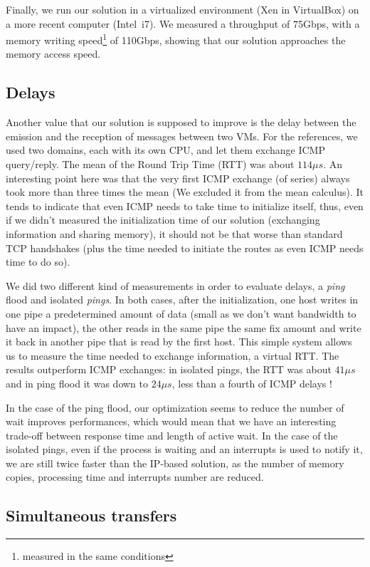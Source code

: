 \documentclass[journal]{IEEEtran}
\begin{document}
Finally, we run our solution in a virtualized environment (Xen in VirtualBox) on a more recent computer (Intel\textregistered ~i7). We measured a throughput of 75Gbps, with a memory writing speed\footnote{measured in the same conditions} of 110Gbps, showing that our solution approaches the memory access speed. 

\subsection{Delays}

Another value that our solution is supposed to improve is the delay between the emission and the reception of messages between two VMs. For the references, we used two domains, each with its own CPU, and let them exchange ICMP query/reply. The mean of the Round Trip Time (RTT) was about $114 \mu s$. An interesting point here was that the very first ICMP exchange (of series) always took more than three times the mean (We excluded it from the mean calculus). It tends to indicate that even ICMP needs to take time to initialize itself, thus, even if we didn't measured the initialization time of our solution (exchanging information and sharing memory), it should not be that worse than standard TCP handshakes (plus the time needed to initiate the routes as even ICMP needs time to do so).

We did two different kind of measurements in order to evaluate delays, a \emph{ping} flood and isolated \emph{pings}. In both cases, after the initialization, one host writes in one pipe a predetermined amount of data (small as we don't want bandwidth to have an impact), the other reads in the same pipe the same fix amount and write it back in another pipe that is read by the first host. This simple system allows us to measure the time needed to exchange information, a virtual RTT. The results outperform ICMP exchanges: in isolated pings, the RTT was about $41 \mu s$ and in ping flood it was down to $24 \mu s$, less than a fourth of ICMP delays !

In the case of the ping flood, our optimization seems to reduce the number of wait improves performances, which would mean that we have an interesting trade-off between response time and length of active wait. In the case of the isolated pings, even if the process is waiting and an interrupts is used to notify it, we are still twice faster than the IP-based solution, as the number of memory copies, processing time and interrupts number are reduced.

\subsection{Simultaneous transfers}
\end{document}
